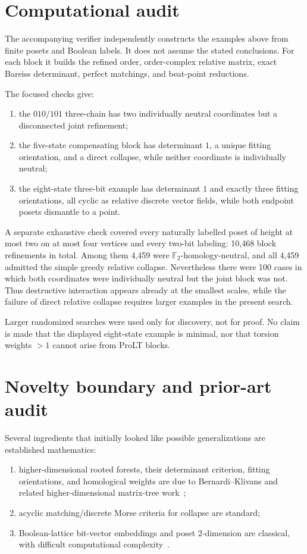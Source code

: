 \documentclass[11pt]{article}
\theoremstyle{definition}
\newcommand{\F}{\mathbb F_2}
\begin{document}
\section{Computational audit}

The accompanying verifier independently constructs the examples above from finite posets and Boolean labels. It does not assume the stated conclusions. For each block it builds the refined order, order-complex relative matrix, exact Bareiss determinant, perfect matchings, and beat-point reductions.

The focused checks give:
\begin{enumerate}[label=(\roman*)]
\item the $010/101$ three-chain has two individually neutral coordinates but a disconnected joint refinement;
\item the five-state compensating block has determinant $1$, a unique fitting orientation, and a direct collapse, while neither coordinate is individually neutral;
\item the eight-state three-bit example has determinant $1$ and exactly three fitting orientations, all cyclic as relative discrete vector fields, while both endpoint posets dismantle to a point.
\end{enumerate}

A separate exhaustive check covered every naturally labelled poset of height at most two on at most four vertices and every two-bit labeling: 10,468 block refinements in total. Among them 4,459 were $\F$-homology-neutral, and all 4,459 admitted the simple greedy relative collapse. Nevertheless there were 100 cases in which both coordinates were individually neutral but the joint block was not. Thus destructive interaction appears already at the smallest scales, while the failure of direct relative collapse requires larger examples in the present search.

Larger randomized searches were used only for discovery, not for proof. No claim is made that the displayed eight-state example is minimal, nor that torsion weights $>1$ cannot arise from ProLT blocks.

\section{Novelty boundary and prior-art audit}

Several ingredients that initially looked like possible generalizations are established mathematics:
\begin{enumerate}[label=(\roman*)]
\item higher-dimensional rooted forests, their determinant criterion, fitting orientations, and homological weights are due to Bernardi--Klivans and related higher-dimensional matrix-tree work~\cite{BernardiKlivans2016,DuvalKlivansMartin2016};
\item acyclic matching/discrete Morse criteria for collapse are standard;
\item Boolean-lattice bit-vector embeddings and poset 2-dimension are classical, with difficult computational complexity~\cite{Habib2004}.
\end{enumerate}
\end{document}
